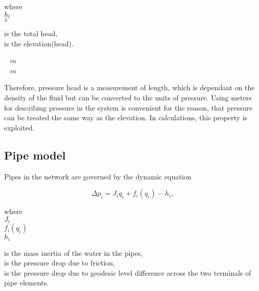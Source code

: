 \begin{minipage}[t]{0.20\textwidth}
where\\
\hspace*{8mm} $h_t$ \\
\hspace*{8mm} $z$ 
\end{minipage}
\begin{minipage}[t]{0.68\textwidth}
\vspace*{2mm}
is the total head,\\
is the elevation(head).
\end{minipage}
\begin{minipage}[t]{0.10\textwidth}
\vspace*{2mm}
\textcolor{White}{te}$\unit{m}$\\
\textcolor{White}{te}$\unit{m}$
\end{minipage}

Therefore, pressure head is a measurement of length, which is dependant on the density of the fluid but can be converted to the units of pressure. Using meters for describing pressure in the system is convenient for the reason, that pressure can be treated the same way as the elevation. In calculations, this property is exploited. 

\subsection{Pipe model}
\label{pipe_component}

Pipes in the network are governed by the dynamic equation

\begin{equation}
\label{complete_pipemodel}
  \Delta p_i = J_i \dot{q_i} + f_i(q_i) - h_i,
\end{equation}

 \begin{minipage}[t]{0.20\textwidth}
where\\
\hspace*{8mm} $J_i$ \\
\hspace*{8mm} $f_i(q_i)$ \\
\hspace*{8mm} $ h_i$ 
\end{minipage}
\begin{minipage}[t]{0.68\textwidth}
\vspace*{2mm}
is the mass inertia of the water in the pipes,\\ 
is the pressure drop due to friction,\\
is the pressure drop due to geodesic level difference across the two terminals of pipe elements.
\end{minipage}

